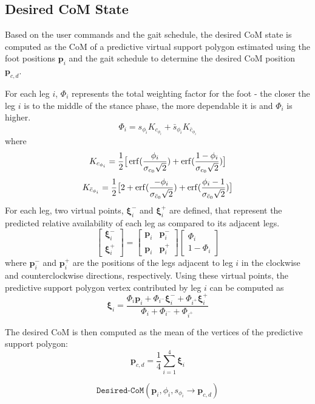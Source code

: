 \documentclass[12pt,a4paper]{article}
\theoremstyle{plain}
\theoremstyle{definition}
\theoremstyle{remark}
\begin{document}
\subsection{Desired CoM State}

Based on the user commands and the gait schedule, the desired CoM state is computed as the CoM of a predictive virtual support polygon estimated using the foot positions $\mathbf{p}_i$ and the gait schedule to determine the desired CoM position $\mathbf{p}_{c,d}$.

For each leg $i$, $\Phi_i$ represents the total weighting factor for the foot - the closer the leg $i$ is to the middle of the stance phase, the more dependable it is and $\Phi_i$ is higher. 
\[ \Phi_i = s_{\phi_i}K_{c_{\phi_i}} + \bar{s}_{\phi_i}K_{\bar{c}_{\phi_i}}\]
where
\[K_{c_{\phi_i}} = \dfrac{1}{2}\big[\erf(\frac{\phi_i}{\sigma_{c_0}\sqrt{2}}) + \erf(\frac{1 - \phi_i}{\sigma_{c_0}\sqrt{2}})\big]\]
\[K_{\bar{c}_{\phi_i}} = \dfrac{1}{2}\big[2 + \erf(\frac{-\phi_i}{\sigma_{\bar{c}_0}\sqrt{2}}) + \erf(\frac{\phi_i-1}{\sigma_{\bar{c}_0}\sqrt{2}})\big]\]
For each leg, two virtual points, $\mathbf{\xi}^-_i$ and $\mathbf{\xi}^+_i$ are defined, that represent the predicted relative availability of each leg as compared to its adjacent legs. 
\[
\begin{bmatrix}
    \mathbf{\xi}^-_i \\[4pt]
    \mathbf{\xi}^+_i
\end{bmatrix} = \begin{bmatrix}
    \mathbf{p}_i & \mathbf{p}^-_i\\[4pt]
    \mathbf{p}_i & \mathbf{p}^+_i
\end{bmatrix} 
\begin{bmatrix}
    \Phi_i \\[4pt]
    1 - \Phi_i
\end{bmatrix}\]
where $\mathbf{p}^-_i$ and $\mathbf{p}^+_i$ are the positions of the legs adjacent to leg $i$ in the clockwise and counterclockwise directions, respectively. Using these virtual points, the predictive support polygon vertex contributed by leg $i$ can be computed as 
\[ \mathbf{\xi}_i = \dfrac{\Phi_i\mathbf{p}_i + \Phi_{i^-}\mathbf{\xi}^-_{i} + \Phi_{i^+}\mathbf{\xi}^+_{i}}{\Phi_i + \Phi_{i^-} + \Phi_{i^+}}\]

The desired CoM is then computed as the mean of the vertices of the predictive support polygon:
\[ \mathbf{p}_{c,d} = \dfrac{1}{4}\sum_{i=1}^{4} \mathbf{\xi}_i\]

\[\texttt{Desired-CoM}(\mathbf{p}_i, \phi_i, s_{\phi_i} \rightarrow \mathbf{p}_{c,d})\]
\end{document}
